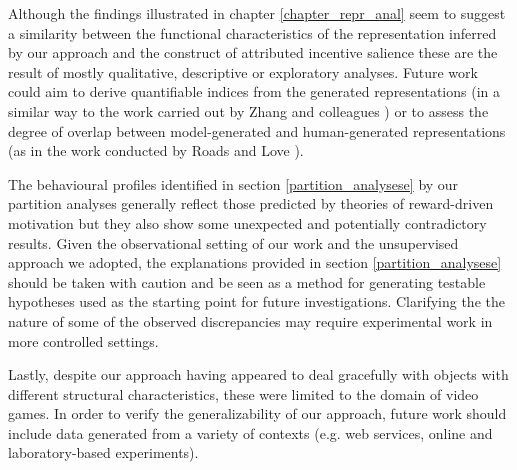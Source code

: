 Although the findings illustrated in chapter \ref{chapter_repr_anal} seem to suggest a similarity between the functional characteristics of the representation inferred by our approach and the construct of attributed incentive salience these are the result of mostly qualitative, descriptive or exploratory analyses. Future work could aim to derive quantifiable indices from the generated representations (in a similar way to the work carried out by Zhang and colleagues \cite{zhang2009neural}) or to assess the degree of overlap between model-generated and human-generated representations (as in the work conducted by Roads and Love \cite{roads2021enriching}).

The behavioural profiles identified in section \ref{partition_analysese} by our partition analyses generally reflect those predicted by theories of reward-driven motivation \cite{thorndike1927law,skinner1965science,berridge2004motivation} but they also show some unexpected and potentially contradictory results. Given the observational setting of our work and the unsupervised approach we adopted, the explanations provided in section \ref{partition_analysese} should be taken with caution and be seen as a method for generating testable hypotheses used as the starting point for future investigations. Clarifying the the nature of some of the observed discrepancies may require experimental work in more controlled settings. 

Lastly, despite our approach having appeared to deal gracefully with objects with different structural characteristics, these were limited to the domain of video games. In order to verify the generalizability of our approach, future work should include data generated from a variety of contexts (e.g. web services, online and laboratory-based experiments).  

